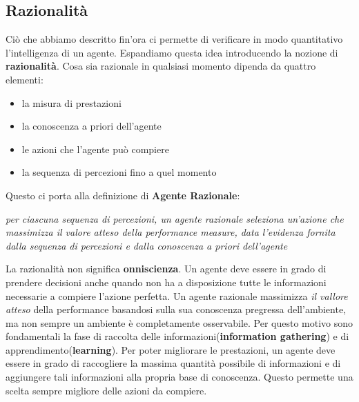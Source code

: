 \subsection{Razionalità}
Ciò che abbiamo descritto fin'ora ci permette di verificare in modo quantitativo l'intelligenza di un agente.
Espandiamo questa idea introducendo la nozione di \textbf{razionalità}.
Cosa sia razionale in qualsiasi momento dipenda da quattro elementi:
\begin{itemize}
  \item la misura di prestazioni
  \item la conoscenza a priori dell'agente
  \item le azioni che l'agente può compiere
  \item la sequenza di percezioni fino a quel momento
\end{itemize}
Questo ci porta alla definizione di \textbf{Agente Razionale}:
      \begin{center}
      \emph{per ciascuna sequenza di percezioni, un agente razionale seleziona un'azione che massimizza il valore atteso della performance measure, data l'evidenza 
      fornita dalla sequenza di percezioni e dalla conoscenza a priori dell'agente}
      \end{center}
La razionalità non significa \textbf{onniscienza}. Un agente deve essere in grado di prendere decisioni anche quando
non ha a disposizione tutte le informazioni necessarie a compiere l'azione perfetta. Un agente razionale massimizza \emph{il vallore atteso} della performance
basandosi sulla sua conoscenza pregressa dell'ambiente, ma  non sempre un ambiente è completamente osservabile. Per questo motivo sono
fondamentali la fase di raccolta delle informazioni(\textbf{information gathering}) e di apprendimento(\textbf{learning}). Per poter
migliorare le prestazioni, un  agente deve essere in grado di raccogliere la massima quantità possibile di informazioni
e di aggiungere tali informazioni alla propria base di conoscenza. Questo permette una scelta sempre migliore delle azioni da compiere.
